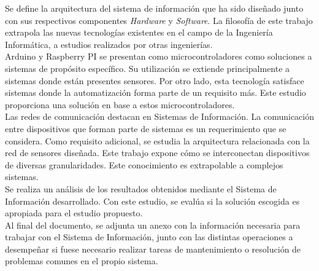 Se define la arquitectura del sistema de información que ha sido diseñado junto con sus respectivos componentes \textit{Hardware} y \textit{Software}. La filosofía de este trabajo extrapola las nuevas tecnologías existentes en el campo de la Ingeniería Informática, a estudios realizados por otras ingenierías.\\

Arduino y Raspberry PI se presentan como microcontroladores como soluciones a sistemas de propósito específico. Su utilización se extiende principalmente a sistemas donde están presentes sensores. Por otro lado, esta tecnología satisface sistemas donde la automatización forma parte de un requisito más. Este estudio proporciona una solución en base a estos microcontroladores.\\

Las redes de comunicación destacan en Sistemas de Información. La comunicación entre dispositivos que forman parte de sistemas es un requerimiento que se considera. Como requisito adicional, se estudia la arquitectura relacionada con la red de sensores diseñada. Este trabajo expone cómo se interconectan dispositivos de diversas granularidades. Este conocimiento es extrapolable a complejos sistemas.\\

Se realiza un análisis de los resultados obtenidos mediante el Sistema de Información desarrollado. Con este estudio, se evalúa si la solución escogida es apropiada para el estudio propuesto.\\

Al final del documento, se adjunta un anexo con la información necesaria para trabajar con el Sistema de Información, junto con las distintas operaciones a desempeñar si fuese necesario realizar tareas de mantenimiento o resolución de problemas comunes en el propio sistema.


\thispagestyle{empty}

\newpage
\newpage

